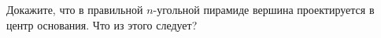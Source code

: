Докажите, что в правильной $n$-угольной пирамиде вершина проектируется в центр основания. Что из этого следует?